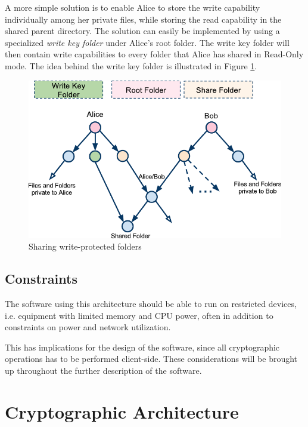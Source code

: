 \documentclass[pdftex,english,10pt,b5paper,twoside]{book}
\begin{document}
A more simple solution is to enable Alice to store the write capability
individually among her private files, while storing the read capability in the
shared parent directory. The solution can easily be implemented by using a
specialized \emph{write key folder} under Alice's root folder. The write key
folder will then contain write capabilities to every folder that Alice has
shared in Read-Only mode. The idea behind the write key folder is illustrated
in Figure \ref{fig:AS:readonly}.

\begin{figure}[h!]
    \centering
    \includegraphics[width=\columnwidth]{ArchitectureShareReadOnlyFolder.pdf}
    \caption{Sharing write-protected folders}
    \label{fig:AS:readonly}
\end{figure}

\subsection{Constraints}

The software using this architecture should be able to run on restricted
devices, i.e. equipment with limited memory and \ac{CPU} power, often in
addition to constraints on power and network utilization.

This has implications for the design of the software, since all cryptographic
operations has to be performed client-side. These considerations will be
brought up throughout the further description of the software.

\section{Cryptographic Architecture}
\label{chap:CS}
\end{document}
